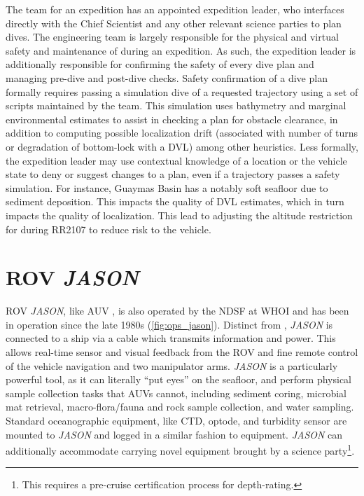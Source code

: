 The \Sentry team for an expedition has an appointed expedition leader, who interfaces directly with the Chief Scientist and any other relevant science parties to plan \Sentry dives. The \Sentry engineering team is largely responsible for the physical and virtual safety and maintenance of \Sentry during an expedition. As such, the expedition leader is additionally responsible for confirming the safety of every dive plan and managing pre-dive and post-dive checks. Safety confirmation of a dive plan formally requires passing a simulation dive of a requested trajectory using a set of scripts maintained by the \Sentry team. This simulation uses bathymetry and marginal environmental estimates to assist in checking a plan for obstacle clearance, in addition to computing possible localization drift (associated with number of turns or degradation of bottom-lock with a DVL) among other heuristics. Less formally, the expedition leader may use contextual knowledge of a location or the vehicle state to deny or suggest changes to a plan, even if a trajectory passes a safety simulation. For instance, Guaymas Basin has a notably soft seafloor due to sediment deposition. This impacts the quality of DVL estimates, which in turn impacts the quality of \Sentry localization. This lead to adjusting the altitude restriction for \Sentry during RR2107 to reduce risk to the vehicle.


\section{ROV \emph{JASON}}
ROV \emph{JASON}, like AUV \Sentry, is also operated by the NDSF at WHOI\autocite{ballard1993medea,yoerger1986jason,petitt2004power} and has been in operation since the late 1980s (\cref{fig:ops_jason}). Distinct from \Sentry, \emph{JASON} is connected to a ship via a cable which transmits information and power. This allows real-time sensor and visual feedback from the ROV and fine remote control of the vehicle navigation and two manipulator arms. \emph{JASON} is a particularly powerful tool, as it can literally ``put eyes'' on the seafloor, and perform physical sample collection tasks that AUVs cannot, including sediment coring, microbial mat retrieval, macro-flora/fauna and rock sample collection, and water sampling. Standard oceanographic equipment, like CTD, optode, and turbidity sensor are mounted to \emph{JASON} and logged in a similar fashion to \Sentry equipment. \emph{JASON} can additionally accommodate carrying novel equipment brought by a science party\footnote{This requires a pre-cruise certification process for depth-rating.}. 

